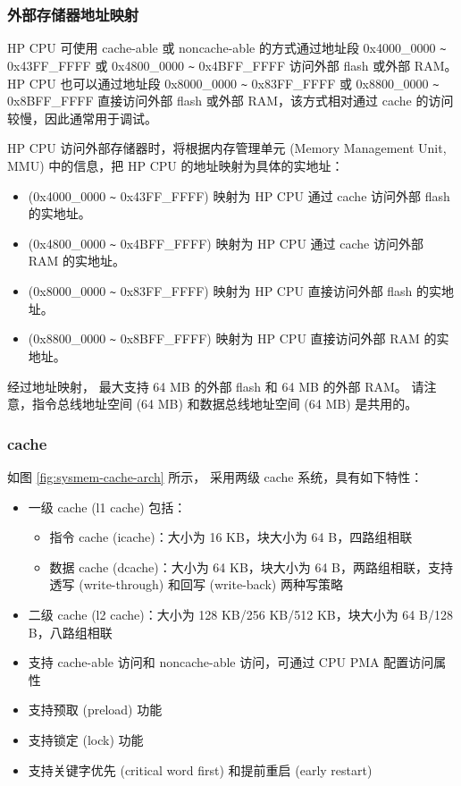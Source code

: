 \documentclass[main\_\_CN.tex]{subfiles}
\begin{document}
\subsubsection{外部存储器地址映射}

HP CPU 可使用 cache-able 或 noncache-able 的方式通过地址段 0x4000\_0000 \verb+~+ 0x43FF\_FFFF 或 0x4800\_0000 \verb+~+ 0x4BFF\_FFFF 访问外部 flash 或外部 RAM。HP CPU 也可以通过地址段 0x8000\_0000 \verb+~+ 0x83FF\_FFFF 或 0x8800\_0000 \verb+~+ 0x8BFF\_FFFF 直接访问外部 flash 或外部 RAM，该方式相对通过 cache 的访问较慢，因此通常用于调试。

HP CPU 访问外部存储器时，将根据内存管理单元 (Memory Management Unit, MMU) 中的信息，把 HP CPU 的地址映射为具体的实地址：
\begin{itemize}
    \item (0x4000\_0000 \verb+~+ 0x43FF\_FFFF) 映射为 HP CPU 通过 cache 访问外部 flash 的实地址。
    \item (0x4800\_0000 \verb+~+ 0x4BFF\_FFFF) 映射为 HP CPU 通过 cache 访问外部 RAM 的实地址。
    \item (0x8000\_0000 \verb+~+ 0x83FF\_FFFF) 映射为 HP CPU 直接访问外部 flash 的实地址。
    \item (0x8800\_0000 \verb+~+ 0x8BFF\_FFFF) 映射为 HP CPU 直接访问外部 RAM 的实地址。
\end{itemize}
经过地址映射，\chipname{} 最大支持 64 MB 的外部 flash 和 64 MB 的外部 RAM。
请注意，指令总线地址空间 (64 MB) 和数据总线地址空间 (64 MB) 是共用的。

\subsubsection{cache}

如图 \ref{fig:sysmem-cache-arch} 所示，\chipname{} 采用两级 cache 系统，具有如下特性：
\begin{itemize}
    \item 一级 cache (l1 cache) 包括：
    \begin{itemize}
        \item 指令 cache (icache)：大小为 16 KB，块大小为 64 B，四路组相联
        \item 数据 cache (dcache)：大小为 64 KB，块大小为 64 B，两路组相联，支持透写 (write-through) 和回写 (write-back) 两种写策略
    \end{itemize}
    \item 二级 cache (l2 cache)：大小为 128 KB/256 KB/512 KB，块大小为 64 B/128 B，八路组相联
    \item 支持 cache-able 访问和 noncache-able 访问，可通过 CPU PMA 配置访问属性
    \item 支持预取 (preload) 功能
    \item 支持锁定 (lock) 功能
    \item 支持关键字优先 (critical word first) 和提前重启 (early restart)
\end{itemize}
\end{document}
